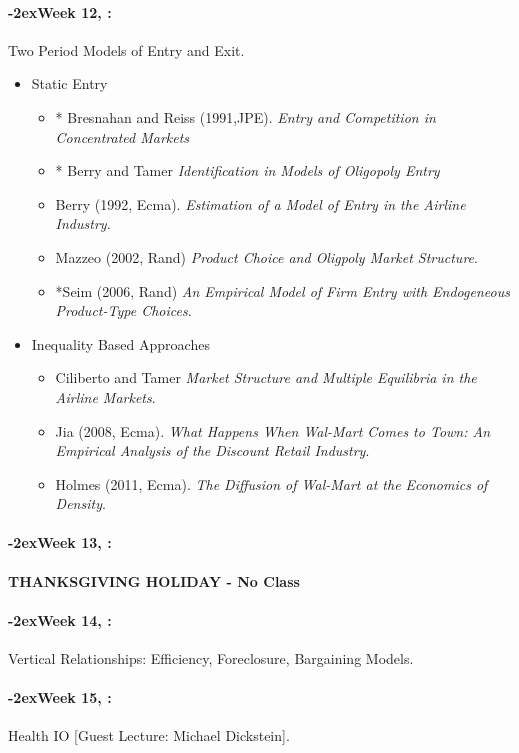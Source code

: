 \documentclass[11pt]{article}
\newcommand{\week}[1]{%
  \paragraph*{\kern-2ex\quad #1, \syldate{\today}:}%
  \ifdim\wd1=\wd\THURSDAY
    \AdvanceDate[7]
  \else
    \AdvanceDate[7]
  \fi%
}
\begin{document}
\week{Week 12} Two Period Models of Entry and Exit.
\begin{itemize}
\item Static Entry
\begin{itemize}
\item * Bresnahan and Reiss (1991,JPE). \textit{Entry and Competition in Concentrated Markets}
\item * Berry and Tamer \textit{Identification in Models of Oligopoly Entry}
\item Berry (1992, Ecma). \textit{Estimation of a Model of Entry in the Airline Industry}.
\item Mazzeo (2002, Rand) \textit{Product Choice and Oligpoly Market Structure}.
\item *Seim (2006, Rand) \textit{ An Empirical Model of Firm Entry with Endogeneous Product-Type Choices}.
\end{itemize}
\item Inequality Based Approaches
\begin{itemize}
\item Ciliberto and Tamer \textit{Market Structure and Multiple Equilibria in the Airline Markets}.
\item Jia (2008, Ecma). \textit{What Happens When Wal-Mart Comes to Town: An Empirical Analysis of the Discount Retail Industry}.
\item Holmes (2011, Ecma). \textit{The Diffusion of Wal-Mart at the Economics of Density}.
\end{itemize}
\end{itemize}

\week{Week 13} \textbf{THANKSGIVING HOLIDAY - No Class}

\week{Week 14} Vertical Relationships: Efficiency, Foreclosure, Bargaining Models.
\week{Week 15} Health IO [Guest Lecture: Michael Dickstein].
\end{document}
